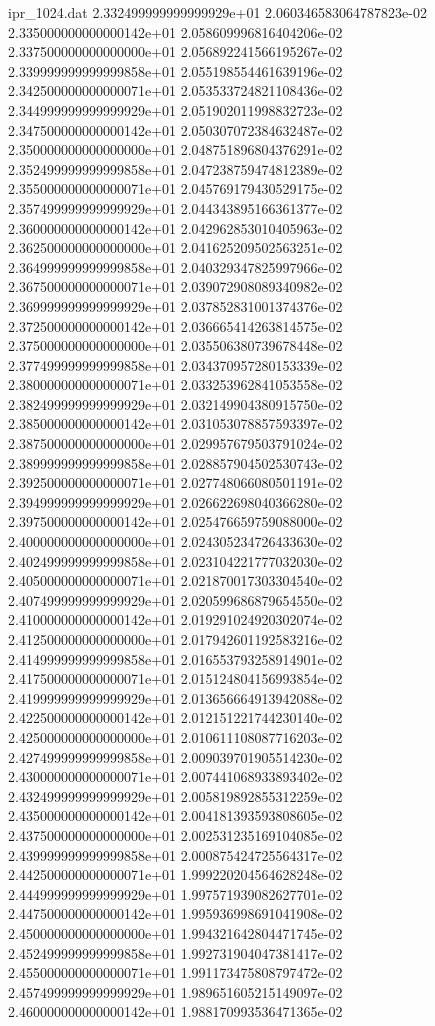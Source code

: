 \begin{filecontents}{ipr_1024.dat}
2.332499999999999929e+01 2.060346583064787823e-02
2.335000000000000142e+01 2.058609996816404206e-02
2.337500000000000000e+01 2.056892241566195267e-02
2.339999999999999858e+01 2.055198554461639196e-02
2.342500000000000071e+01 2.053533724821108436e-02
2.344999999999999929e+01 2.051902011998832723e-02
2.347500000000000142e+01 2.050307072384632487e-02
2.350000000000000000e+01 2.048751896804376291e-02
2.352499999999999858e+01 2.047238759474812389e-02
2.355000000000000071e+01 2.045769179430529175e-02
2.357499999999999929e+01 2.044343895166361377e-02
2.360000000000000142e+01 2.042962853010405963e-02
2.362500000000000000e+01 2.041625209502563251e-02
2.364999999999999858e+01 2.040329347825997966e-02
2.367500000000000071e+01 2.039072908089340982e-02
2.369999999999999929e+01 2.037852831001374376e-02
2.372500000000000142e+01 2.036665414263814575e-02
2.375000000000000000e+01 2.035506380739678448e-02
2.377499999999999858e+01 2.034370957280153339e-02
2.380000000000000071e+01 2.033253962841053558e-02
2.382499999999999929e+01 2.032149904380915750e-02
2.385000000000000142e+01 2.031053078857593397e-02
2.387500000000000000e+01 2.029957679503791024e-02
2.389999999999999858e+01 2.028857904502530743e-02
2.392500000000000071e+01 2.027748066080501191e-02
2.394999999999999929e+01 2.026622698040366280e-02
2.397500000000000142e+01 2.025476659759088000e-02
2.400000000000000000e+01 2.024305234726433630e-02
2.402499999999999858e+01 2.023104221777032030e-02
2.405000000000000071e+01 2.021870017303304540e-02
2.407499999999999929e+01 2.020599686879654550e-02
2.410000000000000142e+01 2.019291024920302074e-02
2.412500000000000000e+01 2.017942601192583216e-02
2.414999999999999858e+01 2.016553793258914901e-02
2.417500000000000071e+01 2.015124804156993854e-02
2.419999999999999929e+01 2.013656664913942088e-02
2.422500000000000142e+01 2.012151221744230140e-02
2.425000000000000000e+01 2.010611108087716203e-02
2.427499999999999858e+01 2.009039701905514230e-02
2.430000000000000071e+01 2.007441068933893402e-02
2.432499999999999929e+01 2.005819892855312259e-02
2.435000000000000142e+01 2.004181393593808605e-02
2.437500000000000000e+01 2.002531235169104085e-02
2.439999999999999858e+01 2.000875424725564317e-02
2.442500000000000071e+01 1.999220204564628248e-02
2.444999999999999929e+01 1.997571939082627701e-02
2.447500000000000142e+01 1.995936998691041908e-02
2.450000000000000000e+01 1.994321642804471745e-02
2.452499999999999858e+01 1.992731904047381417e-02
2.455000000000000071e+01 1.991173475808797472e-02
2.457499999999999929e+01 1.989651605215149097e-02
2.460000000000000142e+01 1.988170993536471365e-02

\end{filecontents}
